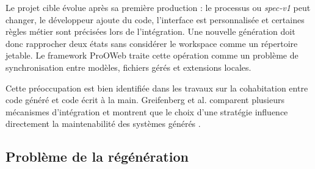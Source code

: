






\label{sec:chap3-preservation}

Le projet cible évolue après sa première production : le processus ou
\textit{spec-v1} peut changer, le développeur ajoute du code, l'interface est
personnalisée et certaines règles métier sont précisées lors de l'intégration.
Une nouvelle génération doit donc rapprocher deux états sans considérer le
workspace comme un répertoire jetable. Le framework ProOWeb traite cette
opération comme un problème de synchronisation entre modèles, fichiers gérés et
extensions locales.

Cette préoccupation est bien identifiée dans les travaux sur la cohabitation entre code généré et code écrit à la main. Greifenberg et al. comparent plusieurs mécanismes d'intégration et montrent que le choix d'une stratégie influence directement la maintenabilité des systèmes générés \cite{greifenberg2015}.

\subsection{Problème de la régénération}


